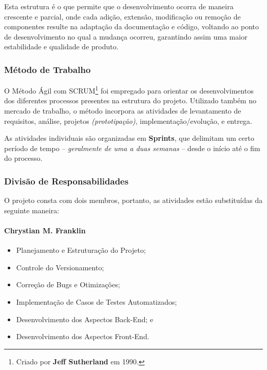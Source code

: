 \documentclass[a4paper,12pt]{article}
\begin{document}
Esta estrutura é o que permite que o desenvolvimento ocorra de maneira crescente e parcial, onde cada adição, extensão,
 modificação ou remoção de componentes resulte na adaptação da documentação e código, voltando ao ponto de desenvolvimento 
 no qual a mudança ocorreu, garantindo assim uma maior estabilidade e qualidade de produto.

\subsubsection{Método de Trabalho}
O Método Ágil com SCRUM\footnote{
    Criado por \textbf{Jeff Sutherland} em 1990.
} foi empregado para orientar os desenvolvimentos dos diferentes processos presentes na estrutura do projeto. Utilizado também no mercado 
de trabalho, o método incorpora as atividades de levantamento de requisitos, análise, projetos \textit{(prototipação)}, 
implementação/evolução, e entrega.

As atividades individuais são organizadas em \textbf{Sprints}, que delimitam um certo período de 
tempo -- \textit{geralmente de uma a duas semanas} -- desde o início até o fim do processo.

\subsubsection{Divisão de Responsabilidades}
O projeto consta com dois membros, portanto, as atividades estão substituídas da seguinte maneira:

\paragraph{Chrystian M. Franklin}
\begin{itemize}
    	\item Planejamento e Estruturação do Projeto;
    	\item Controle do Versionamento;
    	\item Correção de Bugs e Otimizações;
    	\item Implementação de Casos de Testes Automatizados;
    	\item Desenvolvimento dos Aspectos Back-End; e
    	\item Desenvolvimento dos Aspectos Front-End.
\end{itemize}
\end{document}
